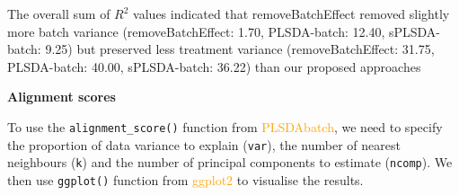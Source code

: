 \documentclass[
]{book}
\newenvironment{Shaded}{\begin{snugshade}}{\end{snugshade}}
\newcommand{\AttributeTok}[1]{\textcolor[rgb]{0.77,0.63,0.00}{#1}}
\newcommand{\CommentTok}[1]{\textcolor[rgb]{0.56,0.35,0.01}{\textit{#1}}}
\newcommand{\ControlFlowTok}[1]{\textcolor[rgb]{0.13,0.29,0.53}{\textbf{#1}}}
\newcommand{\DecValTok}[1]{\textcolor[rgb]{0.00,0.00,0.81}{#1}}
\newcommand{\FloatTok}[1]{\textcolor[rgb]{0.00,0.00,0.81}{#1}}
\newcommand{\FunctionTok}[1]{\textcolor[rgb]{0.00,0.00,0.00}{#1}}
\newcommand{\NormalTok}[1]{#1}
\newcommand{\OtherTok}[1]{\textcolor[rgb]{0.56,0.35,0.01}{#1}}
\newcommand{\SpecialCharTok}[1]{\textcolor[rgb]{0.00,0.00,0.00}{#1}}
\begin{document}
The overall sum of \(R^2\) values indicated that removeBatchEffect removed slightly more batch variance (removeBatchEffect: 1.70, PLSDA-batch: 12.40, sPLSDA-batch: 9.25) but preserved less treatment variance (removeBatchEffect: 31.75, PLSDA-batch: 40.00, sPLSDA-batch: 36.22) than our proposed approaches

\textbf{Alignment scores}

To use the \texttt{alignment\_score()} function from \textcolor{orange}{PLSDAbatch}, we need to specify the proportion of data variance to explain (\texttt{var}), the number of nearest neighbours (\texttt{k}) and the number of principal components to estimate (\texttt{ncomp}). We then use \texttt{ggplot()} function from \textcolor{orange}{ggplot2} to visualise the results.

\begin{Shaded}
\end{Shaded}
\end{document}
